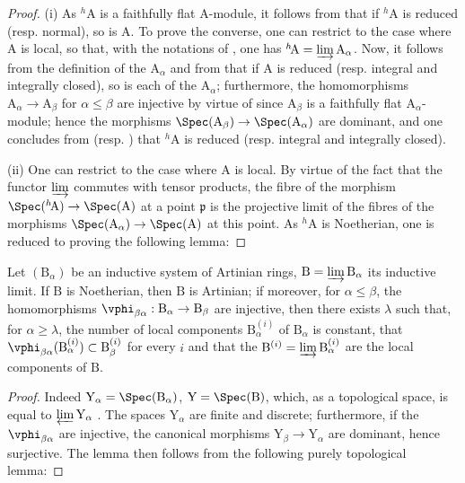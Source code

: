 \begin{proof}
(i) As ${}^h\!\mathrm{A}$ is a faithfully flat A-module, it follows from  that if ${}^h\!\mathrm{A}$ is reduced (resp. normal), so is A.
To prove the converse, one can restrict to the case where A is local, so that, with the notations of , one has ${}^h\!\mathrm{A}=\varinjlim\mathrm{A}_\alpha$.
Now, it follows from the definition of the $\mathrm{A}_\alpha$ and from  that if A is reduced (resp. integral and integrally closed), so is each of the $\mathrm{A}_\alpha$;
furthermore, the homomorphisms $\mathrm{A}_\alpha\to\mathrm{A}_\beta$ for $\alpha\leq\beta$ are injective by virtue of  since $\mathrm{A}_\beta$ is a faithfully flat $\mathrm{A}_\alpha$-module;
hence the morphisms $\Spec(\mathrm{A}_\beta)\to\Spec(\mathrm{A}_\alpha)$ are dominant, and one concludes from  (resp. ) that ${}^h\!\mathrm{A}$ is reduced (resp. integral and integrally closed).

(ii) One can restrict to the case where A is local.
By virtue of the fact that the functor $\varinjlim$ commutes with tensor products, the fibre of the morphism $\Spec({}^h\!\mathrm{A})\to\Spec(\mathrm{A})$ at a point $\mathfrak{p}$ is the projective limit of the fibres of the morphisms $\Spec(\mathrm{A}_\alpha)\to\Spec(\mathrm{A})$ at this point.
As ${}^h\!\mathrm{A}$ is Noetherian, one is reduced to proving the following lemma:
\end{proof}

\begin{lemma}[18.6.9.1]
\label{IV.18.6.9.1}
Let $(\mathrm{B}_\alpha)$ be an inductive system of Artinian rings, $\mathrm{B}=\varinjlim\mathrm{B}_\alpha$ its inductive limit.
If $\mathrm{B}$ is Noetherian, then $\mathrm{B}$ is Artinian;
if moreover, for $\alpha\leq\beta$, the homomorphisms $\vphi_{\beta\alpha}:\mathrm{B}_\alpha\to\mathrm{B}_\beta$ are injective, then there exists $\lambda$ such that, for $\alpha\geq\lambda$, the number of local components $\mathrm{B}_\alpha^{(i)}$ of $\mathrm{B}_\alpha$ is constant, that $\vphi_{\beta\alpha}(\mathrm{B}_\alpha^{(i)})\subset\mathrm{B}_\beta^{(i)}$ for every $i$ and that the $\mathrm{B}^{(i)}=\varinjlim\mathrm{B}_\alpha^{(i)}$ are the local components of $\mathrm{B}$.
\end{lemma}

\begin{proof}
Indeed $\mathrm{Y}_\alpha=\Spec(\mathrm{B}_\alpha)$, $\mathrm{Y}=\Spec(\mathrm{B})$, which, as a topological space, is equal to $\varprojlim\mathrm{Y}_\alpha$ .
The spaces $\mathrm{Y}_\alpha$ are finite and discrete;
furthermore, if the $\vphi_{\beta\alpha}$ are injective, the canonical morphisms $\mathrm{Y}_\beta\to\mathrm{Y}_\alpha$ are dominant, hence surjective.
The lemma then follows from the following purely topological lemma:
\end{proof}

